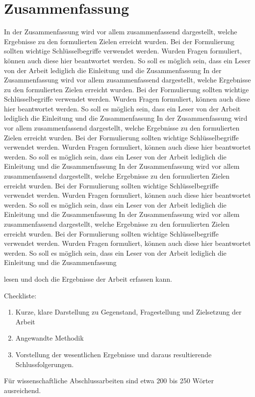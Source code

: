 \chapter{Zusammenfassung}
In der Zusammenfassung wird vor allem zusammenfassend dargestellt, welche Ergebnisse zu den formulierten Zielen erreicht wurden.
Bei der Formulierung sollten wichtige Schlüsselbegriffe verwendet werden.
Wurden Fragen formuliert, können auch diese hier beantwortet werden.
So soll es möglich sein, dass ein Leser von der Arbeit lediglich die Einleitung und die Zusammenfassung
In der Zusammenfassung wird vor allem zusammenfassend dargestellt, welche Ergebnisse zu den formulierten Zielen erreicht wurden.
Bei der Formulierung sollten wichtige Schlüsselbegriffe verwendet werden.
Wurden Fragen formuliert, können auch diese hier beantwortet werden.
So soll es möglich sein, dass ein Leser von der Arbeit lediglich die Einleitung und die Zusammenfassung
In der Zusammenfassung wird vor allem zusammenfassend dargestellt, welche Ergebnisse zu den formulierten Zielen erreicht wurden.
Bei der Formulierung sollten wichtige Schlüsselbegriffe verwendet werden.
Wurden Fragen formuliert, können auch diese hier beantwortet werden.
So soll es möglich sein, dass ein Leser von der Arbeit lediglich die Einleitung und die Zusammenfassung
In der Zusammenfassung wird vor allem zusammenfassend dargestellt, welche Ergebnisse zu den formulierten Zielen erreicht wurden.
Bei der Formulierung sollten wichtige Schlüsselbegriffe verwendet werden.
Wurden Fragen formuliert, können auch diese hier beantwortet werden.
So soll es möglich sein, dass ein Leser von der Arbeit lediglich die Einleitung und die Zusammenfassung
In der Zusammenfassung wird vor allem zusammenfassend dargestellt, welche Ergebnisse zu den formulierten Zielen erreicht wurden.
Bei der Formulierung sollten wichtige Schlüsselbegriffe verwendet werden.
Wurden Fragen formuliert, können auch diese hier beantwortet werden.
So soll es möglich sein, dass ein Leser von der Arbeit lediglich die Einleitung und die Zusammenfassung


 lesen und doch die Ergebnisse der Arbeit erfassen kann.

Checkliste:
\begin{enumerate}
\item Kurze, klare Darstellung zu Gegenstand, Fragestellung und Zielsetzung der Arbeit
\item Angewandte Methodik
\item Vorstellung der wesentlichen Ergebnisse und daraus resultierende Schlussfolgerungen.
\end{enumerate}
Für wissenschaftliche Abschlussarbeiten sind etwa 200 bis 250 Wörter ausreichend.


\vfill
